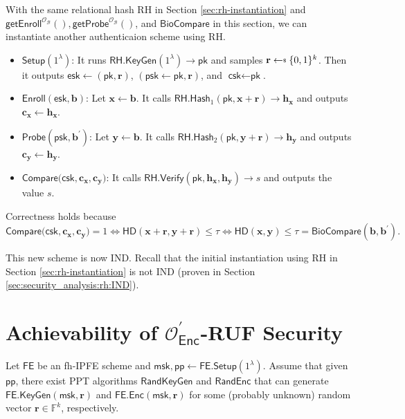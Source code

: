 With the same relational hash \textsf{RH} in Section \ref{sec:rh-instantiation} and $\textsf{getEnroll}^{\mathcal{O}_{\mathcal{B}}}(), \textsf{getProbe}^{\mathcal{O}_{\mathcal{B}}}()$, and $ \textsf{BioCompare}$ in this section, we can instantiate another authenticaion scheme using \textsf{RH}.

\begin{itemize}

	\item $\textsf{Setup}(1^\lambda)$: It runs $\textsf{RH.KeyGen}(1^\lambda) \to \textsf{pk}$ and samples $\mathbf{r} \getsdollar \{0, 1\}^k$. Then it outputs $\textsf{esk} \gets (\textsf{pk}, \mathbf{r})$, $(\textsf{psk} \gets \textsf{pk}, \mathbf{r})$, and $\textsf{csk} \gets \textsf{pk}$.

	\item $\textsf{Enroll}(\textsf{esk}, \mathbf{b})$: Let $\mathbf{x} \gets \mathbf{b}$. It calls $\textsf{RH.Hash}_1(\textsf{pk}, \mathbf{x} + \mathbf{r}) \to \mathbf{h_x}$ and outputs $\mathbf{c_x} \gets \mathbf{h_x}$.

	\item $\textsf{Probe}(\textsf{psk}, \mathbf{b}^\prime)$: Let $\mathbf{y} \gets \mathbf{b}$. It calls $\textsf{RH.Hash}_2(\textsf{pk}, \mathbf{y} + \mathbf{r}) \to \mathbf{h_y}$ and outputs $\mathbf{c_y} \gets \mathbf{h_y}$.

	\item $\textsf{Compare}(\textsf{csk}, \mathbf{c_x}, \mathbf{c_y)}$: It calls $\textsf{RH.Verify}(\textsf{pk}, \mathbf{h_x}, \mathbf{h_y}) \to s$ and outputs the value $s$.

\end{itemize}
Correctness holds because
\[
	\textsf{Compare}(\textsf{csk}, \mathbf{c_x}, \mathbf{c_y)} = 1 \Leftrightarrow \textsf{HD}(\mathbf{x} + \mathbf{r}, \mathbf{y} + \mathbf{r}) \leq \tau \Leftrightarrow \textsf{HD}(\mathbf{x}, \mathbf{y}) \leq \tau = \textsf{BioCompare}(\mathbf{b}, \mathbf{b}^\prime).
\]

This new scheme is now IND. Recall that the initial instantiation using \textsf{RH} in Section \ref{sec:rh-instantiation} is not IND (proven in Section \ref{sec:security_analysis:rh:IND}).


\section{Achievability of $\mathcal{O}^\prime_{\textsf{Enc}}$-RUF Security}

\begin{assumption}
\label{assump:random_key_ct}

Let $\textsf{FE}$ be an fh-IPFE scheme and $\textsf{msk}, \textsf{pp} \gets \textsf{FE.Setup}(1^\lambda)$. Assume that given $\textsf{pp}$, there exist PPT algorithms $\textsf{RandKeyGen}$ and $\textsf{RandEnc}$ that can generate $\textsf{FE.KeyGen}(\textsf{msk}, \mathbf{r})$ and $\textsf{FE.Enc}(\textsf{msk}, \mathbf{r})$ for some (probably unknown) random vector $\mathbf{r} \in \mathbb{F}^k$, respectively.

\end{assumption}

